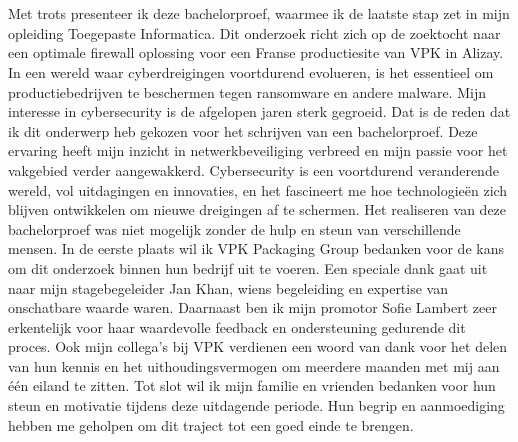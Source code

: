
\chapter*{}%
\label{ch:voorwoord}

Met trots presenteer ik deze bachelorproef, waarmee ik de laatste stap zet in mijn opleiding Toegepaste Informatica. Dit onderzoek richt zich op de zoektocht naar een optimale firewall oplossing voor een Franse productiesite van VPK in Alizay. In een wereld waar cyberdreigingen voortdurend evolueren, is het essentieel om productiebedrijven te beschermen tegen ransomware en andere malware. 
Mijn interesse in cybersecurity is de afgelopen jaren sterk gegroeid. Dat is de reden dat ik dit onderwerp heb gekozen voor het schrijven van een bachelorproef. Deze ervaring heeft mijn inzicht in netwerkbeveiliging verbreed en mijn passie voor het vakgebied verder aangewakkerd. Cybersecurity is een voortdurend veranderende wereld, vol uitdagingen en innovaties, en het fascineert me hoe technologieën zich blijven ontwikkelen om nieuwe dreigingen af te schermen.
Het realiseren van deze bachelorproef was niet mogelijk zonder de hulp en steun van verschillende mensen. In de eerste plaats wil ik VPK Packaging Group bedanken voor de kans om dit onderzoek binnen hun bedrijf uit te voeren. Een speciale dank gaat uit naar mijn stagebegeleider Jan Khan, wiens begeleiding en expertise van onschatbare waarde waren. Daarnaast ben ik mijn promotor Sofie Lambert zeer erkentelijk voor haar waardevolle feedback en ondersteuning gedurende dit proces. Ook mijn collega’s bij VPK verdienen een woord van dank voor het delen van hun kennis en het uithoudingsvermogen om meerdere maanden met mij aan één eiland te zitten.
Tot slot wil ik mijn familie en vrienden bedanken voor hun steun en motivatie tijdens deze uitdagende periode. Hun begrip en aanmoediging hebben me geholpen om dit traject tot een goed einde te brengen.

